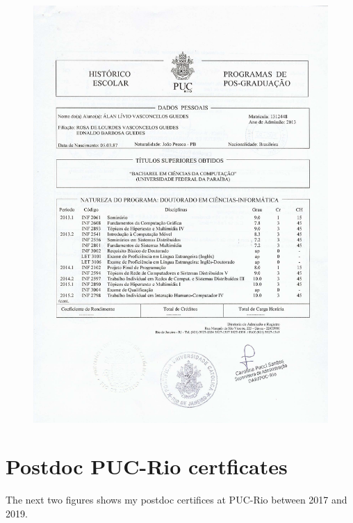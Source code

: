 \documentclass[10pt,a4paper,sans,colorlinks]{moderncv}
\begin{document}
\begin{figure}
    \centering
    \includegraphics[align=t,page=2,width=\textwidth,height=0.6\paperheight, keepaspectratio=true]{certificates/phd-grades.pdf}
\end{figure}

\newpage
\section{Postdoc PUC-Rio certficates}
The next two figures shows my postdoc certifices at PUC-Rio between 2017 and 2019.
\end{document}
